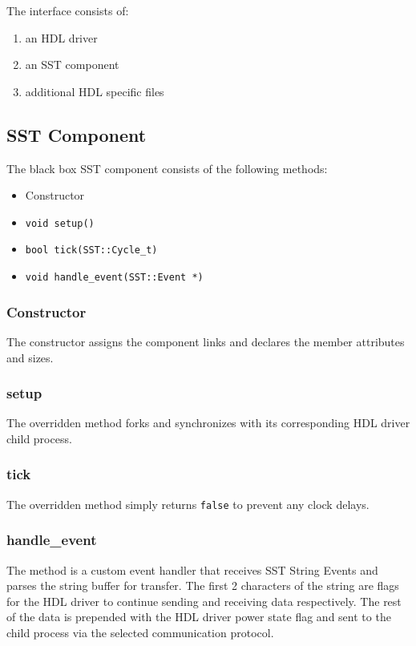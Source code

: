 \documentclass{article}
\begin{document}
  The interface consists of:
  \begin{enumerate}
    \item an HDL driver
    \item an SST component
    \item additional HDL specific files
  \end{enumerate}

    \subsection{SST Component}
    The black box SST component consists of the following methods:
    \begin{itemize}
      \item Constructor
      \item \texttt{void setup()}
      \item \texttt{bool tick(SST::Cycle\_t)}
      \item \texttt{void handle\_event(SST::Event *)}
    \end{itemize}

      \subsubsection{Constructor}
      The constructor assigns the component links and declares the member attributes and sizes.

      \subsubsection{setup}
      The overridden method forks and synchronizes with its corresponding HDL driver child process.

      \subsubsection{tick}
      The overridden method simply returns \texttt{false} to prevent any clock delays.

      \subsubsection{handle\_event}
      The method is a custom event handler that receives SST String Events and parses the string
      buffer for transfer. The first 2 characters of the string are flags for the HDL driver to
      continue sending and receiving data respectively. The rest of the data is prepended with the
      HDL driver power state flag and sent to the child process via the selected communication
      protocol.
\end{document}
